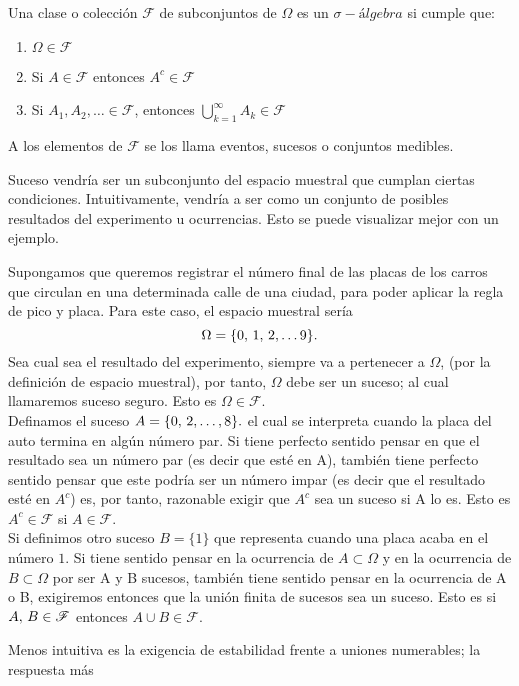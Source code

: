 \begin{Def}
    Una clase o colección $\mathscr{F}$ de subconjuntos de $\Omega$ es un $\sigma- \textit{álgebra}$ si cumple que:
    \begin{enumerate}
        \item $\Omega\in\mathscr{F}$
        \item Si $A\in\mathscr{F}$ entonces $A^c\in\mathscr{F}$
        \item Si $A_1, A_2,\ldots\in\mathscr{F}$, entonces  $\bigcup_{k=1}^\infty A_k\in\mathscr{F}$
    \end{enumerate}
    A los elementos de $\mathscr{F}$ se los llama eventos, sucesos o conjuntos medibles.
\end{Def}
Suceso vendría ser un subconjunto del espacio muestral que cumplan ciertas condiciones.
Intuitivamente, vendría a ser como un conjunto de posibles resultados del experimento u ocurrencias. Esto se puede visualizar mejor con un ejemplo.
\begin{Ejm}
    Supongamos que queremos registrar el número final de las placas de los carros que circulan en una determinada calle de una ciudad, para poder aplicar la regla de pico y placa. Para este caso, el espacio muestral sería $$\Omega=\{0,\thinspace 1,\thinspace 2,\ldots 9\}.$$Sea cual sea el resultado del experimento, siempre va a pertenecer a $\Omega$, (por la definición de espacio muestral), por tanto, $\Omega$ debe ser un suceso; al cual llamaremos suceso seguro. Esto es $\Omega\in\mathscr{F}.$\\ Definamos el suceso $A=\{0,\thinspace 2,\ldots ,8\}.$ el cual se interpreta cuando la placa del auto termina en algún número par. Si tiene perfecto sentido pensar en que el resultado sea un número par (es decir que esté en A), también tiene perfecto sentido pensar que este podría ser un número impar (es decir que el resultado esté en $A^c$) es, por tanto, razonable exigir que $A^c$ sea un suceso si A lo es. Esto es $A^c\in\mathscr{F}$ si $A\in\mathscr{F}.$\\Si definimos otro suceso $B=\{1\}$ que representa cuando una placa acaba en el número $1$. Si tiene sentido pensar en la ocurrencia de $A\subset\Omega $ y en la ocurrencia de $B\subset\Omega $ por ser A y B sucesos, también tiene sentido pensar en la ocurrencia de  A o B, exigiremos entonces que la unión finita de sucesos sea un suceso. Esto es si $A,\thinspace B\in\mathscr{F}$ entonces $A\cup B\in \mathscr{F}.$
\end{Ejm}
Menos intuitiva es la exigencia de estabilidad frente a uniones numerables; la respuesta más
